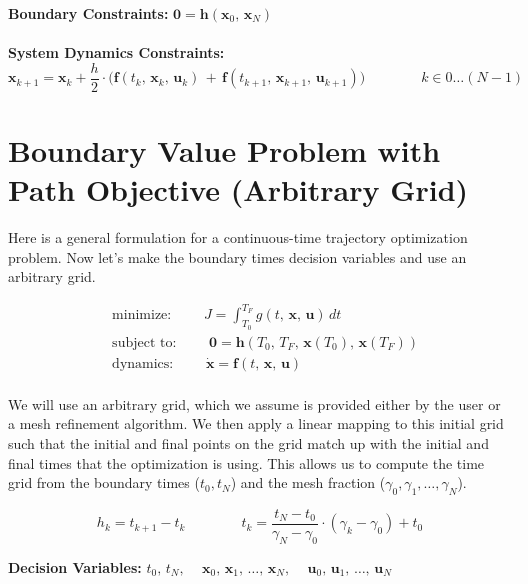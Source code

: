 \textbf{Boundary Constraints: } $\displaystyle
  \bm{0} = \bm{h}(\bm{x}_0, \, \bm{x}_N)
$ \\ \vspace{1em} \\

\textbf{System Dynamics Constraints: } \\
\begin{equation*}
  \bm{x}_{k+1} = \bm{x}_k + \frac{h}{2} \cdot
  \Big(
  \bm{f}(t_k,\,  \bm{x}_k,\,  \bm{u}_k)
  \, + \,
  \bm{f}(t_{k+1},\,  \bm{x}_{k+1},\,  \bm{u}_{k+1})
  \Big)
  \quad \quad \quad \quad k \in 0 \dots (N-1)
\end{equation*}



\section{Boundary Value Problem with Path Objective (Arbitrary Grid)}

Here is a general formulation for a continuous-time trajectory optimization problem.
Now let's make the boundary times decision variables and use an arbitrary grid.

\begin{align*}
  & \text{minimize: } \qquad J = \int_{T_0}^{T_F} \! g(t,\, \bm{x},\, \bm{u}) \, dt \\[1em]
  & \text{subject to: } \qquad \bm{0} = \bm{h}(T_0, \, T_F,\, \bm{x}(T_0), \, \bm{x}(T_F)) \\[1em]
  & \text{dynamics: } \qquad \dot{\bm{x}} = \bm{f}(t,\, \bm{x},\, \bm{u}) \\
\end{align*}

We will use an arbitrary grid, which we
assume is provided either by the user or a mesh refinement algorithm.
We then apply a linear mapping to this initial grid such that the
initial and final points on the grid match up with
the initial and final times that the optimization is using. This allows us to
compute the time grid from the
boundary times ($t_0, t_N$) and the mesh fraction ($\gamma_0, \gamma_1, \dots, \gamma_N$).

\begin{equation*}
  h_k = t_{k+1} - t_k
  \quad \quad \quad \quad
  t_k = \frac{t_N - t_0}{\gamma_N - \gamma_0} \cdot (\gamma_k - \gamma_0) + t_0
\end{equation*}

\textbf{Decision Variables: }  $\displaystyle
  t_0, \, t_N,\,
  \quad
  \bm{x}_0,\, \bm{x}_1,\, \dots, \,\bm{x}_N,\,
  \quad
  \bm{u}_0,\, \bm{u}_1,\, \dots,\, \bm{u}_N\,
$ \\ \vspace{1em} \\

